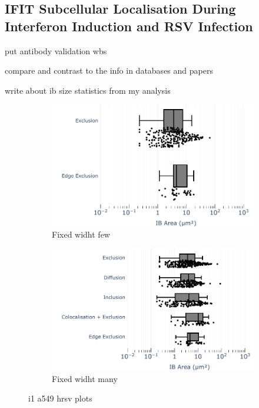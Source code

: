 \subsection{IFIT Subcellular Localisation During Interferon Induction and RSV Infection} \label{subsec:IFIT Subcellular Localisation During Interferon INduction and RSV Infection}
put antibody validation wbs

compare and contrast to the info in databases and papers

write about ib size statistics from my analysis

\begin{figure}
    \begin{subfigure}{0.5\textwidth}
        \includegraphics[width=1\linewidth]{09. Chapter 4/Figs/test-violin-sizeset-fewsamples.pdf} 
        \caption[]{Fixed widht few}
    \end{subfigure}
    \begin{subfigure}{0.5\textwidth}
        \includegraphics[width=1\linewidth]{09. Chapter 4/Figs/test-violin-sizeset-manysamples.pdf}
        \caption[]{Fixed widht many}
    \end{subfigure}
    \caption[i1 a549 hrsv plots]{i1 a549 hrsv plots}
    \label{fig:i1 a549 hrsv plots}
\end{figure}


